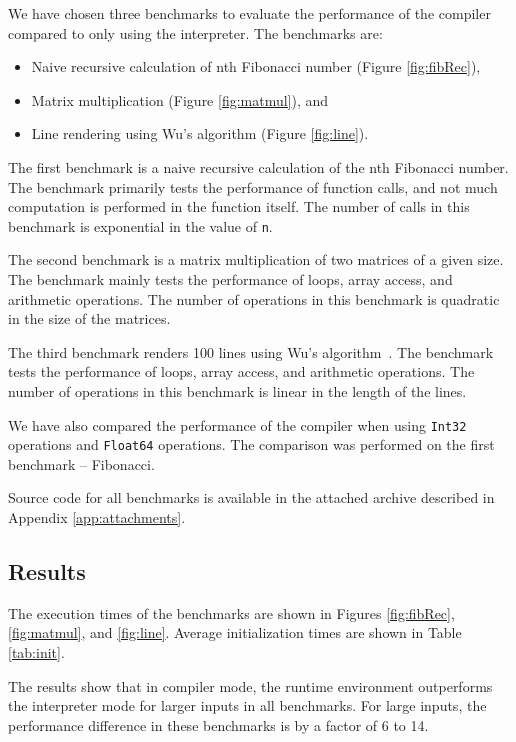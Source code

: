 We have chosen three benchmarks to evaluate the performance of the compiler compared to only using the interpreter. The benchmarks are:
\begin{itemize}
    \item Naive recursive calculation of nth Fibonacci number (Figure \ref{fig:fibRec}),
    \item Matrix multiplication (Figure \ref{fig:matmul}), and
    \item Line rendering using Wu's algorithm (Figure \ref{fig:line}).
\end{itemize}

The first benchmark is a naive recursive calculation of the nth Fibonacci number. The benchmark primarily tests the performance of function calls, and not much computation is performed in the function itself. The number of calls in this benchmark is exponential in the value of \texttt{n}.

The second benchmark is a matrix multiplication of two matrices of a given size. The benchmark mainly tests the performance of loops, array access, and arithmetic operations. The number of operations in this benchmark is quadratic in the size of the matrices.

The third benchmark renders 100 lines using Wu's algorithm~\cite{wu}. The benchmark tests the performance of loops, array access, and arithmetic operations. The number of operations in this benchmark is linear in the length of the lines.

We have also compared the performance of the compiler when using \texttt{Int32} operations and \texttt{Float64} operations. The comparison was performed on the first benchmark -- Fibonacci.

Source code for all benchmarks is available in the attached archive described in Appendix \ref{app:attachments}.


\subsection{Results}

The execution times of the benchmarks are shown in Figures \ref{fig:fibRec}, \ref{fig:matmul}, and \ref{fig:line}. Average initialization times are shown in Table \ref{tab:init}.

The results show that in compiler mode, the runtime environment outperforms the interpreter mode for larger inputs in all benchmarks. For large inputs, the performance difference in these benchmarks is by a factor of 6 to 14.

